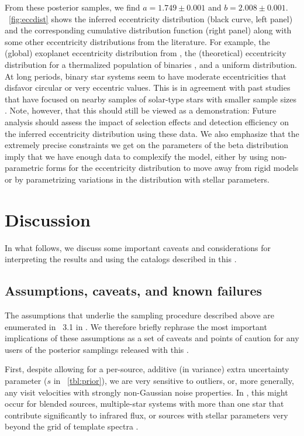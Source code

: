 \documentclass[modern]{aastex63}
\begin{document}
From these posterior samples, we find $a = 1.749 \pm 0.001$ and $b = 2.008 \pm
0.001$.
\figurename~\ref{fig:eccdist} shows the inferred eccentricity distribution
(black curve, left panel) and the corresponding cumulative distribution function
(right panel) along with some other eccentricity distributions from the
literature.
For example, the (global) exoplanet eccentricity distribution from
\citet{Kipping:2013}, the (theoretical) eccentricity distribution for a
thermalized population of binaries \citep{Jeans:1919}, and a uniform
distribution.
At long periods, binary star systems seem to have moderate eccentricities that
disfavor circular or very eccentric values.
This is in agreement with past studies that have focused on nearby samples of
solar-type stars with smaller sample sizes \citep[e.g.,][]{Duquennoy:1991,
Raghavan:2010}.
Note, however, that this should still be viewed as a demonstration: Future
analysis should assess the impact of selection effects and detection efficiency
on the inferred eccentricity distribution using these data.
We also emphasize that the extremely precise constraints we get on the
parameters of the beta distribution imply that we have enough data to complexify
the model, either by using non-parametric forms for the eccentricity
distribution to move away from rigid models or by parametrizing variations in
the distribution with stellar parameters.


\section{Discussion}\label{sec:discussion}

In what follows, we discuss some important caveats and considerations for
interpreting the results and using the catalogs described in this \documentname.

\subsection{Assumptions, caveats, and known failures}
\label{sec:caveats}

The assumptions that underlie the sampling procedure described above are
enumerated in \sectionname~3.1 in \cite{Price-Whelan:2018}.
We therefore briefly rephrase the most important implications of these
assumptions as a set of caveats and points of caution for any users of the
posterior samplings released with this \documentname.

First, despite allowing for a per-source, additive (in variance) extra
uncertainty parameter ($s$ in \tablename~\ref{tbl:prior}), we are very sensitive
to outliers, or, more generally, any visit velocities with strongly non-Gaussian
noise properties.
In \apogee, this might occur for blended sources, multiple-star systems with
more than one star that contribute significantly to infrared flux, or sources
with stellar parameters very beyond the grid of template spectra
\citep{Nidever:2015}.
\end{document}
